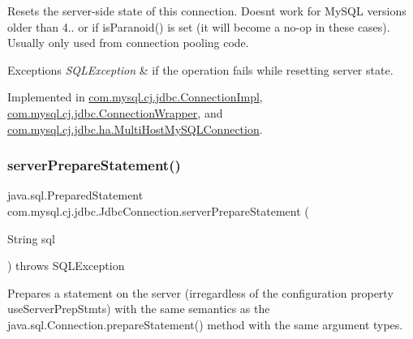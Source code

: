 Resets the server-\/side state of this connection. Doesn\textquotesingle{}t work for My\+S\+QL versions older than 4.. or if is\+Paranoid() is set (it will become a no-\/op in these cases). Usually only used from connection pooling code.


\begin{DoxyExceptions}{Exceptions}
{\em S\+Q\+L\+Exception} & if the operation fails while resetting server state. \\
\hline
\end{DoxyExceptions}


Implemented in \mbox{\hyperlink{classcom_1_1mysql_1_1cj_1_1jdbc_1_1_connection_impl_adccdf6ec2e52545cff1a649ccecbdd62}{com.\+mysql.\+cj.\+jdbc.\+Connection\+Impl}}, \mbox{\hyperlink{classcom_1_1mysql_1_1cj_1_1jdbc_1_1_connection_wrapper_a420204849914ad076e502ba7753ba6b5}{com.\+mysql.\+cj.\+jdbc.\+Connection\+Wrapper}}, and \mbox{\hyperlink{classcom_1_1mysql_1_1cj_1_1jdbc_1_1ha_1_1_multi_host_my_s_q_l_connection_aa4aba4efd08774027532a7a9092bca57}{com.\+mysql.\+cj.\+jdbc.\+ha.\+Multi\+Host\+My\+S\+Q\+L\+Connection}}.

\mbox{\label{interfacecom_1_1mysql_1_1cj_1_1jdbc_1_1_jdbc_connection_add415475386bd7577301fddbdd5518b8}} 
\subsubsection{\texorpdfstring{server\+Prepare\+Statement()}{serverPrepareStatement()}\hspace{0.1cm}{\footnotesize\ttfamily [1/6]}}
{\footnotesize\ttfamily java.\+sql.\+Prepared\+Statement com.\+mysql.\+cj.\+jdbc.\+Jdbc\+Connection.\+server\+Prepare\+Statement (\begin{DoxyParamCaption}\item[{String}]{sql }\end{DoxyParamCaption}) throws S\+Q\+L\+Exception}

Prepares a statement on the server (irregardless of the configuration property \textquotesingle{}use\+Server\+Prep\+Stmts\textquotesingle{}) with the same semantics as the java.\+sql.\+Connection.\+prepare\+Statement() method with the same argument types.


